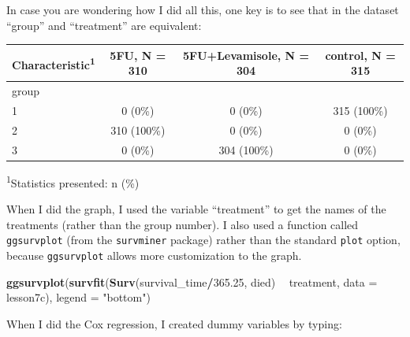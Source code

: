 \documentclass[]{book}
\newenvironment{Shaded}{\begin{snugshade}}{\end{snugshade}}
\newcommand{\DataTypeTok}[1]{\textcolor[rgb]{0.13,0.29,0.53}{#1}}
\newcommand{\FloatTok}[1]{\textcolor[rgb]{0.00,0.00,0.81}{#1}}
\newcommand{\KeywordTok}[1]{\textcolor[rgb]{0.13,0.29,0.53}{\textbf{#1}}}
\newcommand{\NormalTok}[1]{#1}
\newcommand{\OperatorTok}[1]{\textcolor[rgb]{0.81,0.36,0.00}{\textbf{#1}}}
\newcommand{\StringTok}[1]{\textcolor[rgb]{0.31,0.60,0.02}{#1}}
\begin{document}
In case you are wondering how I did all this, one key is to see that in the dataset ``group'' and ``treatment'' are equivalent:

\begin{Shaded}
\end{Shaded}

\captionsetup[table]{labelformat=empty,skip=1pt}
\begin{longtable}{lccc}
\toprule
\textbf{Characteristic}\textsuperscript{1} & \textbf{5FU}, N = 310 & \textbf{5FU+Levamisole}, N = 304 & \textbf{control}, N = 315 \\ 
\midrule
group &  &  &  \\ 
1 & 0 (0\%) & 0 (0\%) & 315 (100\%) \\ 
2 & 310 (100\%) & 0 (0\%) & 0 (0\%) \\ 
3 & 0 (0\%) & 304 (100\%) & 0 (0\%) \\ 
\bottomrule
\end{longtable}
\vspace{-5mm}
\begin{minipage}{\linewidth}
\textsuperscript{1}Statistics presented: n (\%) \\ 
\end{minipage}

When I did the graph, I used the variable ``treatment'' to get the names of the treatments (rather than the group number). I also used a function called \texttt{ggsurvplot} (from the \texttt{survminer} package) rather than the standard \texttt{plot} option, because \texttt{ggsurvplot} allows more customization to the graph.

\begin{Shaded}
\begin{Highlighting}[]
\KeywordTok{ggsurvplot}\NormalTok{(}\KeywordTok{survfit}\NormalTok{(}\KeywordTok{Surv}\NormalTok{(survival_time}\OperatorTok{/}\FloatTok{365.25}\NormalTok{, died) }\OperatorTok{~}\StringTok{ }\NormalTok{treatment, }\DataTypeTok{data =}\NormalTok{ lesson7c),}
           \DataTypeTok{legend =} \StringTok{"bottom"}\NormalTok{)}
\end{Highlighting}
\end{Shaded}

When I did the Cox regression, I created dummy variables by typing:
\end{document}
